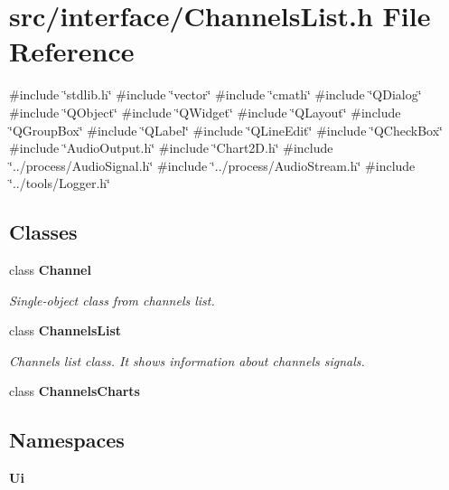 \section{src/interface/\+Channels\+List.h File Reference}
\label{_channels_list_8h}
{\ttfamily \#include \char`\"{}stdlib.\+h\char`\"{}}\newline
{\ttfamily \#include \char`\"{}vector\char`\"{}}\newline
{\ttfamily \#include \char`\"{}cmath\char`\"{}}\newline
{\ttfamily \#include \char`\"{}Q\+Dialog\char`\"{}}\newline
{\ttfamily \#include \char`\"{}Q\+Object\char`\"{}}\newline
{\ttfamily \#include \char`\"{}Q\+Widget\char`\"{}}\newline
{\ttfamily \#include \char`\"{}Q\+Layout\char`\"{}}\newline
{\ttfamily \#include \char`\"{}Q\+Group\+Box\char`\"{}}\newline
{\ttfamily \#include \char`\"{}Q\+Label\char`\"{}}\newline
{\ttfamily \#include \char`\"{}Q\+Line\+Edit\char`\"{}}\newline
{\ttfamily \#include \char`\"{}Q\+Check\+Box\char`\"{}}\newline
{\ttfamily \#include \char`\"{}Audio\+Output.\+h\char`\"{}}\newline
{\ttfamily \#include \char`\"{}Chart2\+D.\+h\char`\"{}}\newline
{\ttfamily \#include \char`\"{}../process/\+Audio\+Signal.\+h\char`\"{}}\newline
{\ttfamily \#include \char`\"{}../process/\+Audio\+Stream.\+h\char`\"{}}\newline
{\ttfamily \#include \char`\"{}../tools/\+Logger.\+h\char`\"{}}\newline
\subsection*{Classes}
\begin{DoxyCompactItemize}
\item 
class \textbf{ Channel}
\begin{DoxyCompactList}\small\item\em Single-\/object class from channels list. \end{DoxyCompactList}\item 
class \textbf{ Channels\+List}
\begin{DoxyCompactList}\small\item\em Channels list class. It shows information about channels signals. \end{DoxyCompactList}\item 
class \textbf{ Channels\+Charts}
\end{DoxyCompactItemize}
\subsection*{Namespaces}
\begin{DoxyCompactItemize}
\item 
 \textbf{ Ui}
\end{DoxyCompactItemize}
